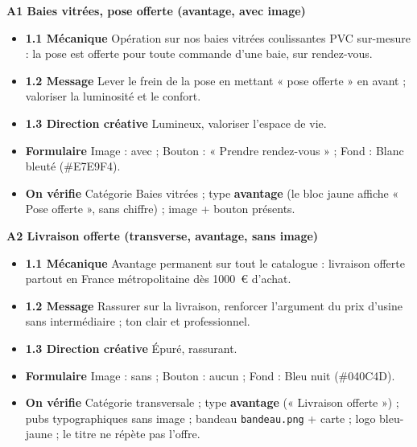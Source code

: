 \documentclass[11pt,a4paper]{article}
\begin{document}
\textbf{A1 \textbullet{} Baies vitrées, pose offerte (avantage, avec image)}
\begin{itemize}[leftmargin=1.4em]
  \item \textbf{1.1 Mécanique} Opération sur nos baies vitrées coulissantes PVC sur-mesure :
        la pose est offerte pour toute commande d'une baie, sur rendez-vous.
  \item \textbf{1.2 Message} Lever le frein de la pose en mettant « pose offerte » en avant ;
        valoriser la luminosité et le confort.
  \item \textbf{1.3 Direction créative} Lumineux, valoriser l'espace de vie.
  \item \textbf{Formulaire} Image : avec ; Bouton : « Prendre rendez-vous » ; Fond : Blanc
        bleuté (\#E7E9F4).
  \item \textbf{On vérifie} Catégorie Baies vitrées ; type \textbf{avantage} (le bloc jaune
        affiche « Pose offerte », sans chiffre) ; image + bouton présents.
\end{itemize}

\textbf{A2 \textbullet{} Livraison offerte (transverse, avantage, sans image)}
\begin{itemize}[leftmargin=1.4em]
  \item \textbf{1.1 Mécanique} Avantage permanent sur tout le catalogue : livraison offerte
        partout en France métropolitaine dès 1000~€ d'achat.
  \item \textbf{1.2 Message} Rassurer sur la livraison, renforcer l'argument du prix d'usine
        sans intermédiaire ; ton clair et professionnel.
  \item \textbf{1.3 Direction créative} Épuré, rassurant.
  \item \textbf{Formulaire} Image : sans ; Bouton : aucun ; Fond : Bleu nuit (\#040C4D).
  \item \textbf{On vérifie} Catégorie transversale ; type \textbf{avantage}
        (« Livraison offerte ») ; pubs typographiques sans image ; bandeau \texttt{bandeau.png}
        + carte ; logo bleu-jaune ; le titre ne répète pas l'offre.
\end{itemize}
\end{document}
